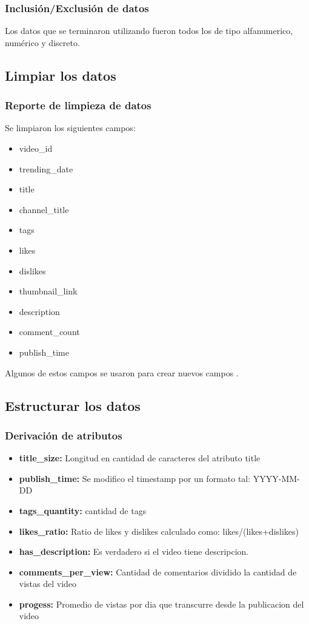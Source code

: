     \subsubsection{Inclusión/Exclusión de datos}
        Los datos que se terminaron utilizando fueron todos los de tipo
        alfanumerico, numérico y discreto.

\subsection{Limpiar los datos}
    \subsubsection{Reporte de limpieza de datos}
        Se limpiaron los siguientes campos:
        \begin{itemize}
            \item video\_id
            \item trending\_date
            \item title
            \item channel\_title
            \item tags
            \item likes
            \item dislikes
            \item thumbnail\_link
            \item description
            \item comment\_count
            \item publish\_time
        \end{itemize}
        Algunos de estos campos se usaron para crear nuevos campos
        .
\subsection{Estructurar los datos}
    \subsubsection{Derivación de atributos}
        \begin{itemize}
            \item \textbf{title\_size:} Longitud en cantidad de caracteres del atributo title
            \item \textbf{publish\_time:} Se modifico el timestamp por un formato tal: YYYY-MM-DD
            \item \textbf{tags\_quantity:} cantidad de tags
            \item \textbf{likes\_ratio:} Ratio de likes y dislikes calculado como: likes/(likes+dislikes)
            \item \textbf{has\_description:} Es verdadero si el video tiene descripcion.
            \item \textbf{comments\_per\_view:} Cantidad de comentarios dividido la cantidad de vistas del video
            \item \textbf{progess:} Promedio de vistas por dia que transcurre desde la publicacion del video
        \end{itemize}

